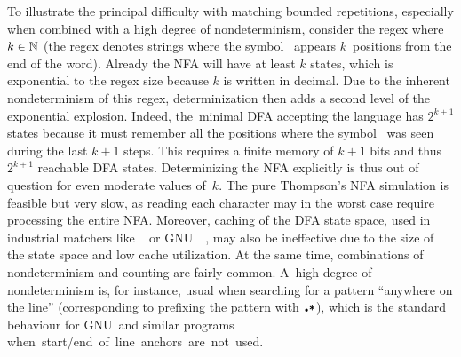 \documentclass[acmsmall,screen]{acmart}
\begin{document}
To illustrate the principal difficulty with matching bounded repetitions,
especially when combined with a high degree of nondeterminism, 
consider the regex  where $k\in\mathbb{N}$ (the regex
denotes strings where the symbol~
appears $k$~positions from the end of the word).
Already the NFA will have at least $k$ states, which is exponential to the regex
size because $k$ is written in decimal. 
%
Due to the inherent nondeterminism of this regex, determinization then adds a second level of the exponential explosion.  
Indeed, the~minimal DFA accepting
the language has $2^{k+1}$ states because it must remember all the
positions where the symbol~ was seen during the last $k+1$ steps.  This
requires a finite memory of $k+1$ bits and thus $2^{k+1}$ reachable
DFA states. 
Determinizing the NFA explicitly is thus out of question for even moderate values
of~$k$. 
The pure Thompson's NFA simulation is feasible but very 
slow, as reading each character may in the
worst case require processing the entire NFA.
Moreover, caching of the DFA state space, used in industrial
matchers like
\retwo~\cite{re2} or GNU~\grep~\cite{grep},
may also be ineffective due to the size of the state space and
low cache utilization.
At the same time, combinations of nondeterminism and counting are
fairly common. A~high degree of nondeterminism is, for instance, usual when
searching for a pattern ``anywhere on the line'' (corresponding to prefixing the
pattern with $\regex{\DOT*}$), which is the standard behaviour for GNU~\grep and
similar programs \mbox{when start/end of line anchors are not used.}
\end{document}
